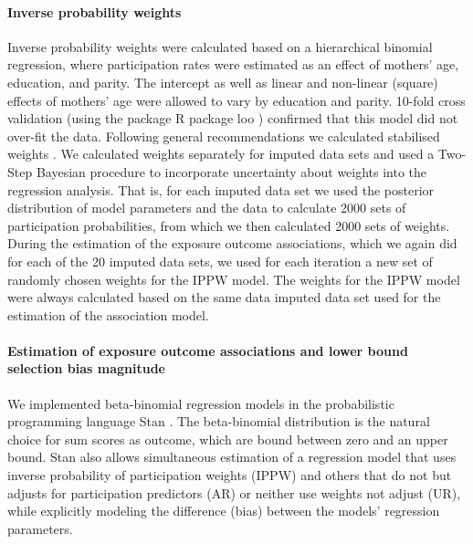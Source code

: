 \documentclass[12pt]{article}
\begin{document}
\paragraph{Inverse probability weights} 
Inverse probability weights were calculated based on a hierarchical binomial regression, where participation rates were estimated as an effect of mothers' age, education, and parity.  The intercept as well as linear and non-linear (square) effects of mothers' age were allowed to vary by education and parity. 10-fold cross validation (using the package R package loo \cite{Vehtari2017-ne}) confirmed that this model did not over-fit the data. Following general recommendations we calculated stabilised weights \cite{Seaman2013-rj}. We calculated weights separately for imputed data sets and used a Two-Step Bayesian procedure \cite{Zigler2016-od} to incorporate uncertainty about weights into the regression analysis. That is, for each imputed data set we used the posterior distribution of model parameters and the data to calculate 2000 sets of participation probabilities, from which we then calculated 2000 sets of weights. During the estimation of the exposure outcome associations, which we again did for each of the 20 imputed data sets, we used for each iteration a new set of randomly chosen weights for the IPPW model. The weights for the IPPW model were always calculated based on the same data imputed data set used for the estimation of the association model.


\paragraph{Estimation of exposure outcome associations and lower bound selection bias magnitude} 
We implemented beta-binomial regression models in the probabilistic programming language Stan \cite{Carpenter2017-gd, Stan_Development_Team2017-lp}. The beta-binomial distribution is the natural choice for sum scores as outcome, which are bound between zero and an upper bound. Stan also allows simultaneous estimation of a regression model that uses inverse probability of participation weights (IPPW) and others that do not but adjusts for participation predictors (AR) or neither use weights not adjust (UR), while explicitly modeling the difference (bias) between the models' regression parameters.
\end{document}
